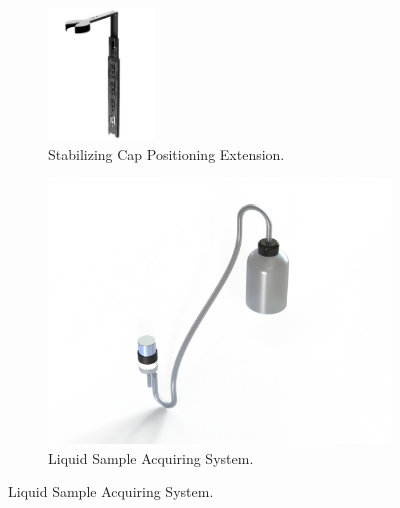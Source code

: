\begin{figure}[h] 
    \centering
    \begin{subfigure}[b]{0.49\columnwidth} 
        \centering
        \includegraphics[height=3.5cm]{Sections/2Design Rationale/images/Stabilizing Cap Positioning Extension (SCPE) .jpg}
        \caption{Stabilizing Cap Positioning Extension.}
        \label{fig:scpe}
    \end{subfigure}
    \hfill
    \begin{subfigure}[b]{0.49\columnwidth}
        \centering
        \includegraphics[width=\linewidth]{Sections/2Design Rationale/images/Pump.png}
        \caption{Liquid Sample Acquiring System.}
        \label{fig:pump}
    \end{subfigure}

    \vspace{0.2cm}


\end{figure}
